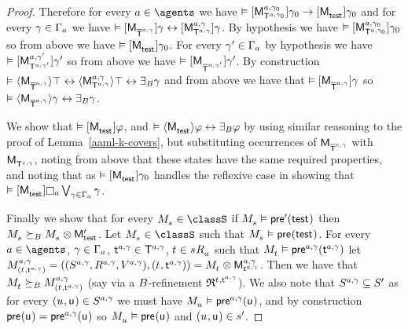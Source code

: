 \begin{proof}
Therefore for every $\agentA \in \agents$ we have $\entails \actionA{\aPModel[\agentA, \gamma_0]{\aStatesT[\agentA, \gamma_0]}} \gamma_0 \implies \actionA{\aPModel{\aStateTest}} \gamma_0$ and
for every $\gamma \in \Gamma_\agentA$ we have $\entails \actionA{\aPModel{\aPStatesT[\agentA, \gamma]}} \gamma \iff \actionA{\aPModel[\agentA, \gamma]{\aStatesT[\agentA, \gamma]}} \gamma$.
By hypothesis we have $\entails \actionA{\aPModel[\agentA, \gamma_0]{\aStatesT[\agentA, \gamma_0]}} \gamma_0$ so from above we have $\entails \actionA{\aPModel{\aStateTest}} \gamma_0$.
For every $\gamma' \in \Gamma_\agentA$ by hypothesis we have $\entails \actionA{\aPModel[\agentA, \gamma']{\aStatesT[\agentA, \gamma']}} \gamma'$ so from above we have $\entails \actionA{\aPModel{\aPStatesT[\agentA, \gamma']}} \gamma'$.
By construction $\entails \actionE{\aPModel{\aPStatesT[\agentA, \gamma]}} \top \iff \actionE{\aPModel[\agentA, \gamma]{\aStatesT[\agentA, \gamma]}} \top \iff \someactsBs \gamma$ and
from above we have that $\entails \actionA{\aPModel{\aPStatesT[\agentA, \gamma]}} \gamma$
so $\entails \actionE{\aPModel{\aPStatesT[\agentA, \gamma]}} \gamma \iff \someactsBs \gamma$.

We show that
$\entails \actionA{\aPModel{\aStateTest}} \phi$, and 
$\entails \actionE{\aPModel{\aStateTest}} \phi \iff \someactsBs \phi$
by using similar reasoning to the proof of Lemma~\ref{aaml-k-covers},
but substituting occurrences of $\aPModel{\aPStatesT[\agentC, \gamma]}$ with $\aPModel{\aStatesT[\agentC, \gamma]}$, noting from above that these states have the same required properties, and noting that as $\entails \actionA{\aPModel{\aStateTest}} \gamma_0$ handles the reflexive case in showing that $\entails \actionA{\aPModel{\aStateTest}} \necessaryA \bigvee_{\gamma \in \Gamma_\agentA} \gamma$.

Finally we show that for every $\kPModel{\kStateS} \in \classS$ if $\kPModel{\kStateS} \entails \aPreconditionP(\aStateTest)$ then $\kPModel{\kStateS} \simulatesBs \kPModel{\kStateS} \exec \aPModelP{\aStateTest}$.
Let $\kPModel{\kStateS} \in \classS$ such that $\kPModel{\kStateS} \entails \aPrecondition(\aStateTest)$.
For every $\agentA \in \agents$, $\gamma \in \Gamma_\agentA$, $\aStateT[\agentA, \gamma] \in \aStatesT[\agentA, \gamma]$, $\kStateT \in \kSuccessorsA{\kStateS}$ such that $\kPModel{\kStateT} \entails \aPrecondition[\agentA, \gamma](\aStateT[\agentA, \gamma])$ let $\kPModelAndTuple[\agentA, \gamma]{(\kStateT, \aStateT[\agentA, \gamma])} = \kPModel{\kStateT} \exec \aPModel[\agentA, \gamma]{\aStateT[\agentA, \gamma]}$.
Then we have that $\kPModel{\kStateT} \simulatesBs \kPModel[\agentA, \gamma]{(\kStateT, \aStateT[\agentA, \gamma])}$ (say via a $\agentsB$-refinement $\refinement^{\kStateT, \aStateT[\agentA, \gamma]}$).
We also note that $\kStates[\agentA, \gamma] \subseteq \kStatesP$ as for every $(\kStateU, \aStateU) \in \kStates[\agentA, \gamma]$ we must have $\kPModel{\kStateU} \entails \aPrecondition[\agentA, \gamma](\aStateU)$, and by construction $\aPrecondition(\aStateU) = \aPrecondition[\agentA, \gamma](\aStateU)$ so $\kPModel{\kStateU} \entails \aPrecondition(\aStateU)$ and $(\kStateU, \aStateU) \in \kStateSP$.


\end{proof}
